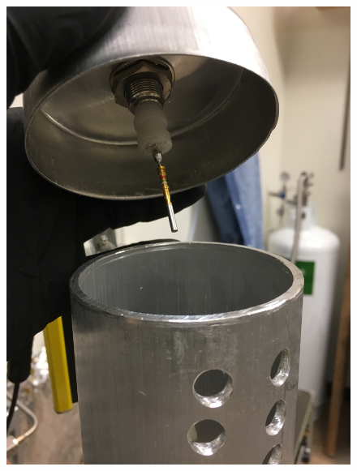 \begin{figure}[htbp]
\begin{minipage}{0.33\textwidth}
    \includegraphics[width=\linewidth]{figures/testbed/ft6_5.jpg}
    \end{minipage}
        \hspace{\fill} %
    \begin{minipage}{0.33\textwidth}

\end{minipage}
\end{figure}
